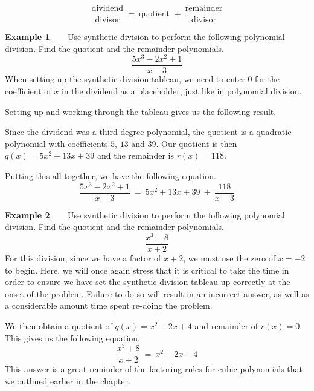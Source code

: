 \documentclass[12pt]{book}
\theoremstyle{definition}
\newtheorem{example}{Example}
\begin{document}
$$\frac{\text{dividend}}{\text{divisor}}~=~\text{quotient~}+~\frac{\text{remainder}}{\text{divisor}}$$
\begin{example}~~~Use synthetic division to perform the following polynomial division.  Find the quotient and the remainder polynomials.
$$\frac{5x^3 - 2x^2 + 1}{x-3}$$
When setting up the synthetic division tableau, we need to enter $0$ for the coefficient of $x$ in the dividend as a placeholder, just like in polynomial division.
\begin{multicols}{2}
Setting up and working through the tableau gives us the following result.

\columnbreak

\begin{center}
\end{center}
\end{multicols}
Since the dividend was a third degree polynomial, the quotient is a quadratic polynomial with coefficients $5$, $13$ and $39$.  Our quotient is then $q(x) = 5x^2+13x+39$ and the remainder is $r(x) = 118$.\par
Putting this all together, we have the following equation.
$$\frac{5x^3 - 2x^2 + 1}{x-3}~=~5x^2+13x+39~+~\frac{118}{x-3}$$
\end{example}
\begin{example}~~~Use synthetic division to perform the following polynomial division.  Find the quotient and the remainder polynomials.
$$\frac{x^3+8}{x+2}$$
For this division, since we have a factor of $x+2$, we must use the zero of $x = -2$ to begin.
Here, we will once again stress that it is critical to take the time in order to ensure we have set the synthetic division tableau up correctly at the onset of the problem.  Failure to do so will result in an incorrect answer, as well as a considerable amount time spent re-doing the problem.
\begin{center}
\end{center}
We then obtain a quotient of $q(x) = x^2-2x+4$ and remainder of $r(x) =0$. This gives us the following equation.
$$\frac{x^3+8}{x+2}~=~x^2-2x+4$$
This answer is a great reminder of the factoring rules for cubic polynomials that we outlined earlier in the chapter.
\end{example}
\end{document}
